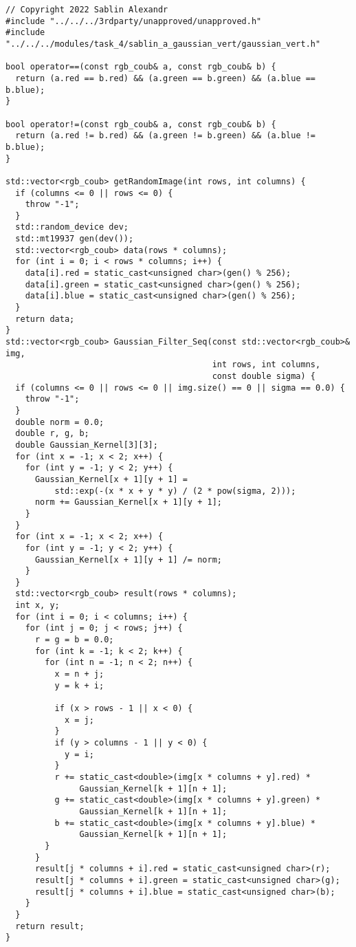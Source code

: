 \documentclass{report}
\begin{document}
\begin{lstlisting}
// Copyright 2022 Sablin Alexandr
#include "../../../3rdparty/unapproved/unapproved.h"
#include "../../../modules/task_4/sablin_a_gaussian_vert/gaussian_vert.h"

bool operator==(const rgb_coub& a, const rgb_coub& b) {
  return (a.red == b.red) && (a.green == b.green) && (a.blue == b.blue);
}

bool operator!=(const rgb_coub& a, const rgb_coub& b) {
  return (a.red != b.red) && (a.green != b.green) && (a.blue != b.blue);
}

std::vector<rgb_coub> getRandomImage(int rows, int columns) {
  if (columns <= 0 || rows <= 0) {
    throw "-1";
  }
  std::random_device dev;
  std::mt19937 gen(dev());
  std::vector<rgb_coub> data(rows * columns);
  for (int i = 0; i < rows * columns; i++) {
    data[i].red = static_cast<unsigned char>(gen() % 256);
    data[i].green = static_cast<unsigned char>(gen() % 256);
    data[i].blue = static_cast<unsigned char>(gen() % 256);
  }
  return data;
}
std::vector<rgb_coub> Gaussian_Filter_Seq(const std::vector<rgb_coub>& img,
                                          int rows, int columns,
                                          const double sigma) {
  if (columns <= 0 || rows <= 0 || img.size() == 0 || sigma == 0.0) {
    throw "-1";
  }
  double norm = 0.0;
  double r, g, b;
  double Gaussian_Kernel[3][3];
  for (int x = -1; x < 2; x++) {
    for (int y = -1; y < 2; y++) {
      Gaussian_Kernel[x + 1][y + 1] =
          std::exp(-(x * x + y * y) / (2 * pow(sigma, 2)));
      norm += Gaussian_Kernel[x + 1][y + 1];
    }
  }
  for (int x = -1; x < 2; x++) {
    for (int y = -1; y < 2; y++) {
      Gaussian_Kernel[x + 1][y + 1] /= norm;
    }
  }
  std::vector<rgb_coub> result(rows * columns);
  int x, y;
  for (int i = 0; i < columns; i++) {
    for (int j = 0; j < rows; j++) {
      r = g = b = 0.0;
      for (int k = -1; k < 2; k++) {
        for (int n = -1; n < 2; n++) {
          x = n + j;
          y = k + i;

          if (x > rows - 1 || x < 0) {
            x = j;
          }
          if (y > columns - 1 || y < 0) {
            y = i;
          }
          r += static_cast<double>(img[x * columns + y].red) *
               Gaussian_Kernel[k + 1][n + 1];
          g += static_cast<double>(img[x * columns + y].green) *
               Gaussian_Kernel[k + 1][n + 1];
          b += static_cast<double>(img[x * columns + y].blue) *
               Gaussian_Kernel[k + 1][n + 1];
        }
      }
      result[j * columns + i].red = static_cast<unsigned char>(r);
      result[j * columns + i].green = static_cast<unsigned char>(g);
      result[j * columns + i].blue = static_cast<unsigned char>(b);
    }
  }
  return result;
}


\end{lstlisting}
\end{document}
